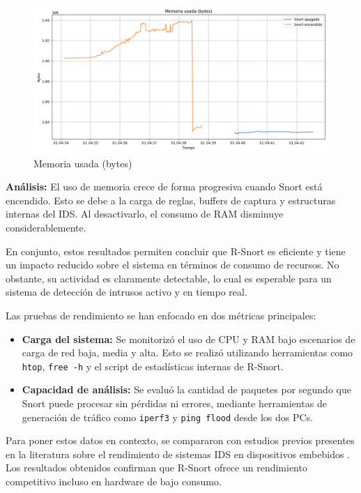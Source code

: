\documentclass[11pt,a4paper,twoside]{report}
\begin{document}
\begin{figure}[H]
	\centering
	\includegraphics[width=\textwidth]{graficas/mem_used.png}
	\caption{Memoria usada (bytes)}
\end{figure}
\textbf{Análisis:} El uso de memoria crece de forma progresiva cuando Snort está encendido. Esto se debe a la carga de reglas, buffers de captura y estructuras internas del IDS. Al desactivarlo, el consumo de RAM disminuye considerablemente.

\pagebreak

En conjunto, estos resultados permiten concluir que R-Snort es eficiente y tiene un impacto reducido sobre el sistema en términos de consumo de recursos. No obstante, su actividad es claramente detectable, lo cual es esperable para un sistema de detección de intrusos activo y en tiempo real.\newline

Las pruebas de rendimiento se han enfocado en dos métricas principales:

\begin{itemize}
	\item \textbf{Carga del sistema:} Se monitorizó el uso de CPU y RAM bajo escenarios de carga de red baja, media y alta. Esto se realizó utilizando herramientas como \texttt{htop}, \texttt{free -h} y el script de estadísticas internas de R-Snort.
	\item \textbf{Capacidad de análisis:} Se evaluó la cantidad de paquetes por segundo que Snort puede procesar sin pérdidas ni errores, mediante herramientas de generación de tráfico como \texttt{iperf3} y \texttt{ping flood} desde los dos PCs.
\end{itemize}

Para poner estos datos en contexto, se compararon con estudios previos presentes en la literatura sobre el rendimiento de sistemas IDS en dispositivos embebidos \cite{delacruz2020ids}. Los resultados obtenidos confirman que R-Snort ofrece un rendimiento competitivo incluso en hardware de bajo consumo.
\end{document}
